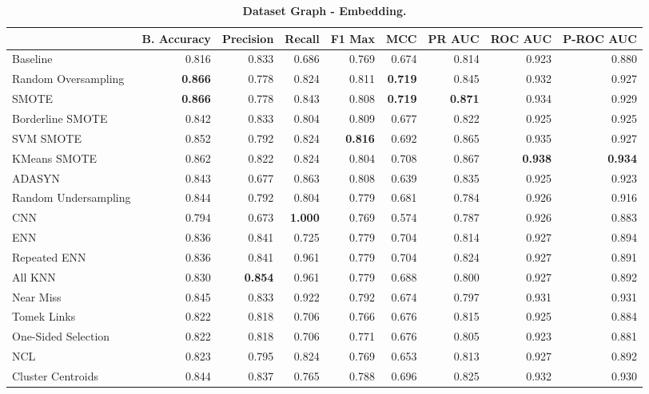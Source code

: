 \begin{table}[H]
    \centering
    \setlength\tabcolsep{2pt}
    \begin{tabularx}{\textwidth}{lRRRRRRRR}
        & B. Accuracy & Precision & Recall & F1 Max & MCC & PR AUC & ROC AUC & P-ROC AUC \\
        \midrule
        Baseline & 0.816 & 0.833 & 0.686 & 0.769 & 0.674 & 0.814 & 0.923 & 0.880 \\
        Random Oversampling & \textbf{0.866} & 0.778 & 0.824 & 0.811 & \textbf{0.719} & 0.845 & 0.932 & 0.927 \\
        SMOTE & \textbf{0.866} & 0.778 & 0.843 & 0.808 & \textbf{0.719} & \textbf{0.871} & 0.934 & 0.929 \\
        Borderline SMOTE & 0.842 & 0.833 & 0.804 & 0.809 & 0.677 & 0.822 & 0.925 & 0.925 \\
        SVM SMOTE & 0.852 & 0.792 & 0.824 & \textbf{0.816} & 0.692 & 0.865 & 0.935 & 0.927 \\
        KMeans SMOTE & 0.862 & 0.822 & 0.824 & 0.804 & 0.708 & 0.867 & \textbf{0.938} & \textbf{0.934} \\
        ADASYN & 0.843 & 0.677 & 0.863 & 0.808 & 0.639 & 0.835 & 0.925 & 0.923 \\
        Random Undersampling & 0.844 & 0.792 & 0.804 & 0.779 & 0.681 & 0.784 & 0.926 & 0.916 \\
        CNN & 0.794 & 0.673 & \textbf{1.000} & 0.769 & 0.574 & 0.787 & 0.926 & 0.883 \\
        ENN & 0.836 & 0.841 & 0.725 & 0.779 & 0.704 & 0.814 & 0.927 & 0.894 \\
        Repeated ENN & 0.836 & 0.841 & 0.961 & 0.779 & 0.704 & 0.824 & 0.927 & 0.891 \\
        All KNN & 0.830 & \textbf{0.854} & 0.961 & 0.779 & 0.688 & 0.800 & 0.927 & 0.892 \\
        Near Miss & 0.845 & 0.833 & 0.922 & 0.792 & 0.674 & 0.797 & 0.931 & 0.931 \\
        Tomek Links & 0.822 & 0.818 & 0.706 & 0.766 & 0.676 & 0.815 & 0.925 & 0.884 \\
        One-Sided Selection & 0.822 & 0.818 & 0.706 & 0.771 & 0.676 & 0.805 & 0.923 & 0.881 \\
        NCL & 0.823 & 0.795 & 0.824 & 0.769 & 0.653 & 0.813 & 0.927 & 0.892 \\
        Cluster Centroids & 0.844 & 0.837 & 0.765 & 0.788 & 0.696 & 0.825 & 0.932 & 0.930 \\
    \end{tabularx}
    \vspace{1mm}
    \caption{\textbf{Dataset Graph - Embedding.}}
\end{table}
